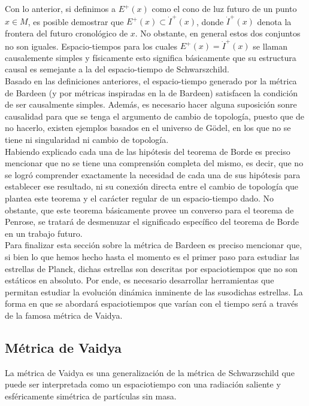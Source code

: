 \documentclass[16pt,a4paper]{article}
\numberwithin{equation}{section}
\theoremstyle{definition}
\begin{document}
Con lo anterior, si definimos a $E^+(x)$ como el cono de luz futuro de un punto $x \in M$, es posible demostrar que $E^+(x) \subset \dot{I}^+(x)$, donde $\dot{I}^+(x)$ denota la frontera del futuro cronológico de $x$. No obstante, en general estos dos conjuntos no son iguales. Espacio-tiempos para los cuales $E^+(x) = \dot{I}^+(x)$ se llaman causalemente simples y físicamente esto significa básicamente que su estructura causal es semejante a la del espacio-tiempo de Schwarszchild.\\

Basado en las definiciones anteriores, el espacio-tiempo generado por la métrica de Bardeen (y por métricas inspiradas en la de Bardeen) satisfacen la condición de ser causalmente simples. Además, es necesario hacer alguna suposición sonre causalidad para que se tenga el argumento de cambio de topología, puesto que de no hacerlo, existen ejemplos basados en el universo de Gödel, en los que no se tiene ni singularidad ni cambio de topología.\\

Habiendo explicado cada una de las hipótesis del teorema de Borde es preciso mencionar que no se tiene una comprensión completa del mismo, es decir, que no se logró comprender exactamente la necesidad de cada una de sus hipótesis para establecer ese resultado, ni su conexión directa entre el cambio de topología que plantea este teorema y el carácter regular de un espacio-tiempo dado. No obstante, que este teorema básicamente provee un converso para el teorema de Penrose, se tratará de desmenuzar el significado específico del teorema de Borde en un trabajo futuro.\\

Para finalizar esta sección sobre la métrica de Bardeen es preciso mencionar que, si bien lo que hemos hecho hasta el momento es el primer paso para estudiar las estrellas de Planck, dichas estrellas son descritas por espaciotiempos que no son estáticos en absoluto. Por ende, es necesario desarrollar herramientas que permitan estudiar la evolución dinámica inminente de las susodichas estrellas. La forma en que se abordará espaciotiempos que varían con el tiempo será a través de la famosa métrica de Vaidya.

\subsection{Métrica de Vaidya}

La métrica de Vaidya \cite{padmanabhan} es una generalización de la métrica de Schwarzschild que puede ser interpretada como un espaciotiempo con una radiación saliente y esféricamente simétrica de partículas sin masa.\\
\end{document}
